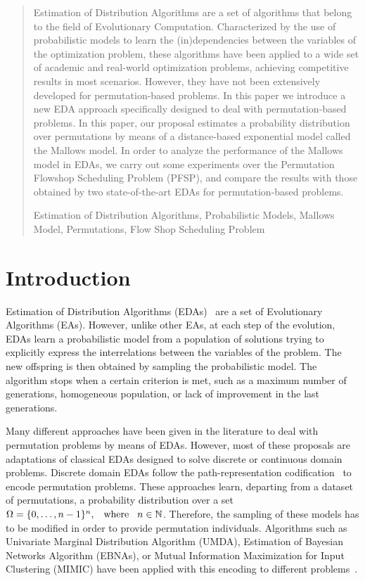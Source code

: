 \documentclass[runningheads]{llncs}
\newcommand{\keywords}[1]{\par\addvspace\baselineskip
\noindent\keywordname\enspace\ignorespaces#1}
\begin{document}
\begin{abstract}
Estimation of Distribution Algorithms are a set of algorithms that belong to the field of Evolutionary Computation. 
Characterized by the use of probabilistic models to learn the (in)dependencies between the variables of the optimization problem, these algorithms have been applied to a wide set of academic and real-world optimization problems, achieving competitive results in most scenarios. However, they have not been extensively developed for permutation-based problems. In this paper we introduce a new EDA approach specifically designed to deal with permutation-based problems. In this paper, our proposal estimates a probability distribution over permutations by means of a distance-based exponential model called the Mallows model. In order to analyze the performance of the Mallows model in EDAs, we carry out some experiments over the Permutation Flowshop Scheduling Problem (PFSP), and compare the results with those obtained by two state-of-the-art EDAs for permutation-based problems.
\keywords{Estimation of Distribution Algorithms, Probabilistic Models, Mallows Model, Permutations, Flow Shop Scheduling Problem} 
\end{abstract}

\section{Introduction}

Estimation of Distribution Algorithms (EDAs)~\cite{muhlenbein96,larra01a,pelikan00a} are a set of Evolutionary Algorithms (EAs). However, unlike other EAs, at each step of the evolution, EDAs learn a probabilistic model from a population of solutions trying to explicitly express the interrelations between the variables of the problem. The new offspring is then obtained by sampling the probabilistic model. The algorithm stops when a certain criterion is met, such as a maximum number of generations, homogeneous population, or lack of improvement in the last generations.          

Many different approaches have been given in the literature to deal with permutation problems by means of EDAs. However, most of these proposals are adaptations of classical EDAs designed to solve discrete or continuous domain problems. Discrete domain EDAs follow the path-representation codification~\cite{Robles02} to encode permutation problems. These approaches learn, departing from a dataset of permutations, a probability distribution over a set $\Omega=\{0,\ldots,n-1\}^n,\hspace{0.3cm} \hbox{where} \hspace{0.3cm} n\in\mathbb{N}$. Therefore, the sampling of these models has to be modified in order to provide permutation individuals. Algorithms such as Univariate Marginal Distribution Algorithm (UMDA), Estimation of Bayesian Networks Algorithm (EBNAs), or Mutual Information Maximization for Input Clustering (MIMIC) have been applied with this encoding to different problems~\cite{DBLP:journals/pr/BengoetxeaLBPB02,Robles02,mendiburu}.
\end{document}
